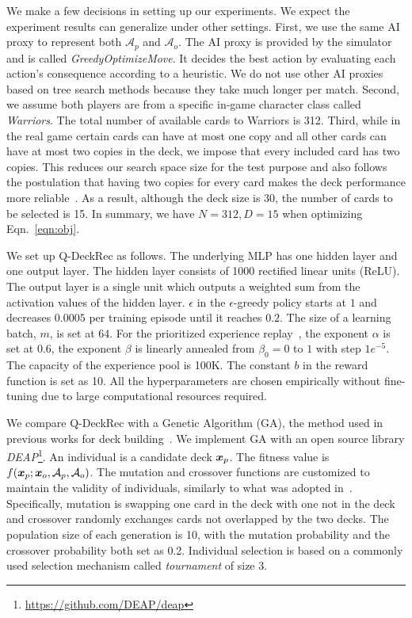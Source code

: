 We make a few decisions in setting up our experiments. We expect the experiment results can generalize under other settings. First, we use the same AI proxy to represent both $\mathcal{A}_p$ and $\mathcal{A}_o$. The AI proxy is provided by the simulator and is called \textit{GreedyOptimizeMove}. It decides the best action by evaluating each action's consequence according to a heuristic. We do not use other AI proxies based on tree search methods because they take much longer per match. Second, we assume both players are from a specific in-game character class called \textit{Warriors}. The total number of available cards to Warriors is 312. Third, while in the real game certain cards can have at most one copy and all other cards can have at most two copies in the deck, we impose that every included card has two copies. This reduces our search space size for the test purpose and also follows the postulation that having two copies for every card makes the deck performance more reliable~\cite{garcia2016evolutionary,garcia2018automated}. As a result, although the deck size is 30, the number of cards to be selected is 15. In summary, we have $N=312, D=15$ when optimizing Eqn.~\ref{eqn:obj}.
    

We set up Q-DeckRec as follows. The underlying MLP has one hidden layer and one output layer. The hidden layer consists of 1000 rectified linear units (ReLU). The output layer is a single unit which outputs a weighted sum from the activation values of the hidden layer. $\epsilon$ in the $\epsilon$-greedy policy starts at $1$ and decreases $0.0005$ per training episode until it reaches $0.2$. The size of a learning batch, $m$, is set at 64. For the prioritized experience replay~\cite{schaul2015prioritized}, the exponent $\alpha$ is set at 0.6, the exponent $\beta$ is linearly annealed from $\beta_0=0$ to $1$ with step $1e^{-5}$. The capacity of the experience pool is 100K. The constant $b$ in the reward function is set as 10. All the hyperparameters are chosen empirically without fine-tuning due to large computational resources required.  

We compare Q-DeckRec with a Genetic Algorithm (GA), the method used in previous works for deck building~\cite{garcia2016evolutionary,bjorke2017deckbuilding}. We implement GA with an open source library \textit{DEAP}\footnote{\url{https://github.com/DEAP/deap}}. An individual is a candidate deck $\boldsymbol{x}_p$. The fitness value is $f(\boldsymbol{x}_p; \boldsymbol{x}_o, \mathcal{A}_p, \mathcal{A}_o)$. The mutation and crossover functions are customized to maintain the validity of individuals, similarly to what was adopted in~\cite{bjorke2017deckbuilding}. Specifically, mutation is swapping one card in the deck with one not in the deck and crossover randomly exchanges cards not overlapped by the two decks. The population size of each generation is 10, with the mutation probability and the crossover probability both set as 0.2. Individual selection is based on a commonly used selection mechanism called \textit{tournament} of size 3. 

